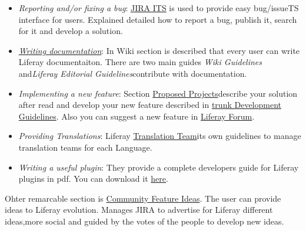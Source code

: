 \begin{itemize}
	\item \textit{Reporting and/or fixing a bug}: \href{http://issues.liferay.com/secure/Dashboard.jspa}{JIRA ITS} is used to provide easy bug/issueTS interface for users. Explained detailed how to report a bug, publish it, search for it and develop a solution.
	\item \href{http://www.liferay.com/community/wiki/-/wiki/Main/Contributing#section-Contributing-Write+documentation}{\textit{Writing documentation}}: In Wiki section is described that every user can write Liferay documentaiton. There are two main guides \textit{Wiki Guidelines} and\nolinebreak\textit{Liferay Editorial Guidelines}\nolinebreakto contribute with documentation.
	\item \textit{Implementing a new feature}: Section \href{http://www.liferay.com/community/wiki?p_p_id=36&amp;p_p_lifecycle=0&amp;p_p_state=normal&amp;p_p_mode=view&amp;p_p_col_id=column-2&amp;p_p_col_count=1&amp;_36_struts_action=%2Fwiki%2Fedit_page&amp;_36_redirect=http%3A%2F%2Fwww.liferay.com%2Fcommunity%2Fwiki%2F-%2Fwiki%2FMain%2FHow%2Bto%2Bcontribute%2Bto%2BLiferay&amp;p_r_p_185834411_nodeId=1071674&amp;p_r_p_185834411_title=Proposed+Projects}{Proposed Projects}\nolinebreakto describe your solution after read and develop your new feature described in \href{http://www.liferay.com/community/wiki/-/wiki/Main/Liferay+Core+Development+Guidelines}{trunk Development Guidelines}. Also you can suggest a new feature in \href{http://www.liferay.com/web/guest/community/forums/-/message_boards/category/1108052}{Liferay Forum}.
	\item \textit{Providing Translations}: Liferay \href{http://www.liferay.com/community/wiki/-/wiki/Main/Translation+Team}{Translation Team}\nolinebreakhas its own guidelines to manage translation teams for each Language.
	\item \textit{Writing a useful plugin}: They provide a complete developers guide for Liferay plugins in pdf. You can download it \href{http://docs.liferay.com/portal/6.0/official/liferay-developer-guide-6.0.pdf}{here}.
\end{itemize} Ohter remarcable section is \href{http://www.liferay.com/community/ideas}{Community Feature Ideas}. The user can provide ideas to Liferay evolution. Manages JIRA to advertise for Liferay different ideas,\nolinebreak\nolinebreakJIRA\nolinebreakbecomes more social and guided by the votes of the people to develop new ideas.

